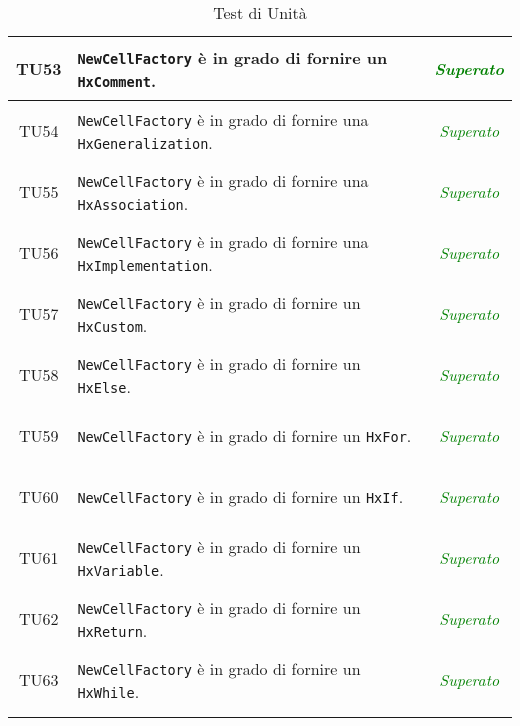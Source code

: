 \begin{longtable}{|c|>{}m{8cm}|c|}
\hypertarget{TU53}{TU53} & \texttt{NewCellFactory} è in grado di fornire un \texttt{HxComment}. & \textcolor{Green}{\textit{Superato}}\\ \hline
\hypertarget{TU54}{TU54} & \texttt{NewCellFactory} è in grado di fornire una \texttt{HxGeneralization}. & \textcolor{Green}{\textit{Superato}}\\ \hline
\hypertarget{TU55}{TU55} & \texttt{NewCellFactory} è in grado di fornire una \texttt{HxAssociation}. & \textcolor{Green}{\textit{Superato}}\\ \hline
\hypertarget{TU56}{TU56} & \texttt{NewCellFactory} è in grado di fornire una \texttt{HxImplementation}. & \textcolor{Green}{\textit{Superato}}\\ \hline
\hypertarget{TU57}{TU57} & \texttt{NewCellFactory} è in grado di fornire un \texttt{HxCustom}. & \textcolor{Green}{\textit{Superato}}\\ \hline
\hypertarget{TU58}{TU58} & \texttt{NewCellFactory} è in grado di fornire un \texttt{HxElse}. & \textcolor{Green}{\textit{Superato}}\\ \hline
\hypertarget{TU59}{TU59} & \texttt{NewCellFactory} è in grado di fornire un \texttt{HxFor}. & \textcolor{Green}{\textit{Superato}}\\ \hline
\hypertarget{TU60}{TU60} & \texttt{NewCellFactory} è in grado di fornire un \texttt{HxIf}. & \textcolor{Green}{\textit{Superato}}\\ \hline
\hypertarget{TU61}{TU61} & \texttt{NewCellFactory} è in grado di fornire un \texttt{HxVariable}. & \textcolor{Green}{\textit{Superato}}\\ \hline
\hypertarget{TU62}{TU62} & \texttt{NewCellFactory} è in grado di fornire un \texttt{HxReturn}. & \textcolor{Green}{\textit{Superato}}\\ \hline
\hypertarget{TU63}{TU63} & \texttt{NewCellFactory} è in grado di fornire un \texttt{HxWhile}. & \textcolor{Green}{\textit{Superato}}\\ \hline
\caption[Test di Unità]{Test di Unità}
\label{tabella:test3}
\end{longtable}
\clearpage


